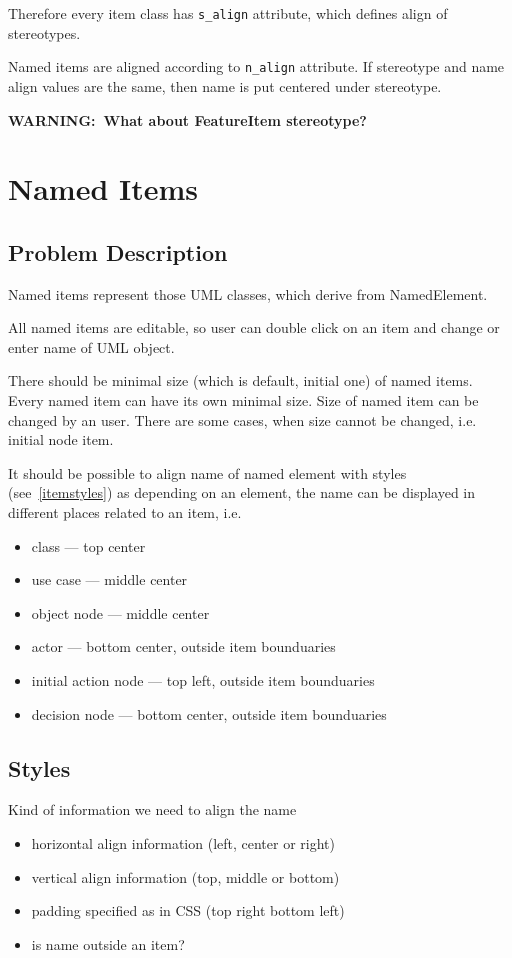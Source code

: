 \documentclass{book}
\newcommand{\rattr}[1]{\texttt{#1}}
\newcommand{\warning}[1]{\textbf{WARNING:~#1}}
\begin{document}
Therefore every item class has \rattr{s\_align} attribute, which defines
align of stereotypes.

Named items are aligned according to \rattr{n\_align} attribute. If
stereotype and name align values are the same, then name is put
centered under stereotype.

\warning{What about FeatureItem stereotype?}

\chapter{Named Items}
\section{Problem Description}
Named items represent those UML classes, which derive from NamedElement.

All named items are editable, so user can double click on an item and
change or enter name of UML object.

There should be minimal size (which is default, initial one) of named
items. Every named item can have its own minimal size. Size of named item
can be changed by an user. There are some cases, when size cannot be
changed, i.e. initial node item.

It should be possible to align name of named element with styles
(see~\ref{itemstyles}) as depending on an element, the name can be
displayed in different places related to an item, i.e.
\begin{itemize}
\item class               --- top center
\item use case            --- middle center
\item object node         --- middle center
\item actor               --- bottom center, outside item bounduaries
\item initial action node --- top left, outside item bounduaries
\item decision node       --- bottom center, outside item bounduaries
\end{itemize}


\section{Styles}
Kind of information we need to align the name
\begin{itemize}
\item horizontal align information (left, center or right)
\item vertical align information (top, middle or bottom)
\item padding specified as in CSS (top right bottom left)
\item is name outside an item?
\end{itemize}
\end{document}
